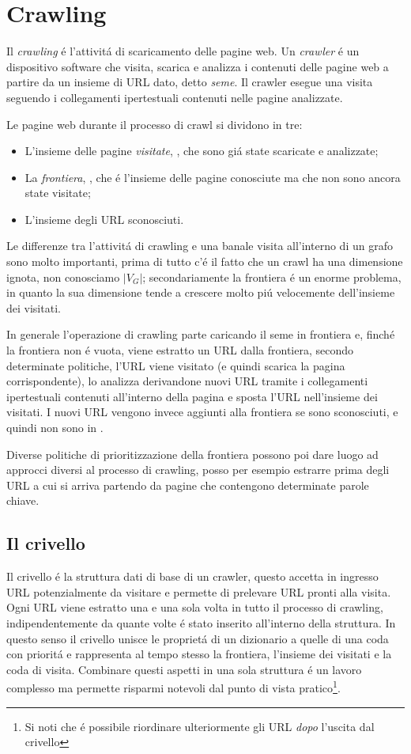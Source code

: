 \section{Crawling}
Il \textit{crawling} é l'attivitá di scaricamento delle pagine web. Un \textit{crawler} é un dispositivo software che visita, scarica e analizza i contenuti delle pagine web a partire da un insieme di URL dato, detto \textit{seme}. Il crawler esegue una visita seguendo i collegamenti ipertestuali contenuti nelle pagine analizzate.

Le pagine web durante il processo di crawl si dividono in tre:
\begin{itemize}
    \item L'insieme delle pagine \textit{visitate}, , che sono giá state scaricate e analizzate;
    \item La \textit{frontiera}, , che é l'insieme delle pagine conosciute ma che non sono ancora state visitate;
    \item L'insieme  degli URL sconosciuti.
\end{itemize}
Le differenze tra l'attivitá di crawling e una banale visita all'interno di un grafo sono molto importanti, prima di tutto c'é il fatto che un crawl ha una dimensione ignota, non conosciamo $|V_G|$; secondariamente la frontiera é un enorme problema, in quanto la sua dimensione tende a crescere molto piú velocemente dell'insieme dei visitati.

In generale l'operazione di crawling parte caricando il seme in frontiera e, finché la frontiera non é vuota, viene estratto un URL dalla frontiera, secondo determinate politiche, l'URL viene visitato (e quindi scarica la pagina corrispondente), lo analizza derivandone nuovi URL tramite i collegamenti ipertestuali contenuti all'interno della pagina e sposta l'URL nell'insieme dei visitati. I nuovi URL vengono invece aggiunti alla frontiera se sono sconosciuti, e quindi non sono in .

Diverse politiche di prioritizzazione della frontiera possono poi dare luogo ad approcci diversi al processo di crawling, posso per esempio estrarre prima degli URL a cui si arriva partendo da pagine che contengono determinate parole chiave.
\subsection{Il crivello}
Il crivello é la struttura dati di base di un crawler, questo accetta in ingresso URL potenzialmente da visitare e permette di prelevare URL pronti alla visita. Ogni URL viene estratto una e una sola volta in tutto il processo di crawling, indipendentemente da quante volte é stato inserito all'interno della struttura. In questo senso il crivello unisce le proprietá di un dizionario a quelle di una coda con prioritá e rappresenta al tempo stesso la frontiera, l'insieme dei visitati e la coda di visita. Combinare questi aspetti in una sola struttura é un lavoro complesso ma permette risparmi notevoli dal punto di vista pratico\footnote{Si noti che é possibile riordinare ulteriormente gli URL \textit{dopo} l'uscita dal crivello}.

